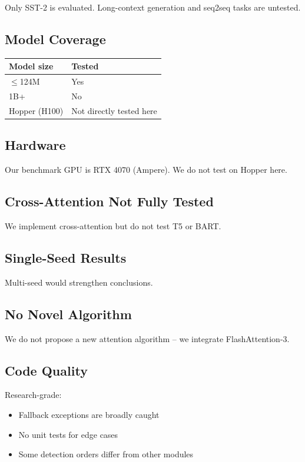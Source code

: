 Only SST-2 is evaluated. Long-context generation and seq2seq tasks are 
untested.

\subsection{Model Coverage}

\begin{table}[H]
\centering
\small
\begin{tabular}{ll}
\toprule
\textbf{Model size} & \textbf{Tested} \\
\midrule
$\le$124M & Yes \\
1B+ & No \\
Hopper (H100) & Not directly tested here \\
\bottomrule
\end{tabular}
\end{table}

\subsection{Hardware}

Our benchmark GPU is RTX 4070 (Ampere). We do not test on Hopper here.

\subsection{Cross-Attention Not Fully Tested}

We implement cross-attention but do not test T5 or BART.

\subsection{Single-Seed Results}

Multi-seed would strengthen conclusions.

\subsection{No Novel Algorithm}

We do not propose a new attention algorithm -- we integrate FlashAttention-3.

\subsection{Code Quality}

Research-grade:
\begin{itemize}
\item Fallback exceptions are broadly caught
\item No unit tests for edge cases
\item Some detection orders differ from other modules

\end{itemize}

